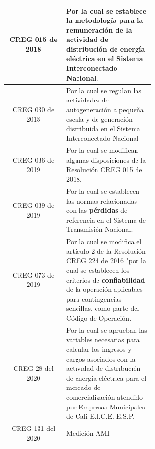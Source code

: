 \documentclass[a5paper]{book}%
\begin{document}
\begin{longtable}{|c|p{0.6\linewidth}|}
CREG 015 de 2018& Por la cual se establece la metodología para la \textbf{remuneración} de la actividad de
distribución de energía eléctrica en el Sistema Interconectado
                  Nacional.\\\hline
  
CREG 030  de 2018 & Por la cual se regulan las actividades de
                    autogeneración a pequeña escala y de generación
                    distribuida en el Sistema Interconectado
                    Nacional\\\hline
  
CREG 036 de 2019& Por la cual se modifican algunas disposiciones de la
                  Resolución CREG 015 de 2018.\\\hline
  
CREG 039 de 2019& Por la cual se establecen las normas relacionadas
                  con las \textbf{pérdidas} de referencia en el
                  Sistema de Transmisión Nacional.\\\hline
  
CREG 073 de 2019& Por la cual se modifica el artículo 2 de la Resolución CREG 224 de 2016 "por la cual
se establecen los criterios de \textbf{confiabilidad} de la operación aplicables para
                  contingencias sencillas, como parte del Código de Operación.\\\hline
  
CREG 28 del 2020 & Por la cual se aprueban las variables necesarias
                     para calcular los ingresos y cargos asociados con
                     la actividad de distribución de energía eléctrica
                     para el mercado de comercialización atendido por
                     Empresas Municipales de Cali
                     E.I.C.E. E.S.P.\\\hline
  
CREG 131 del 2020 & Medición AMI \\\hline
\end{longtable}
\end{document}

